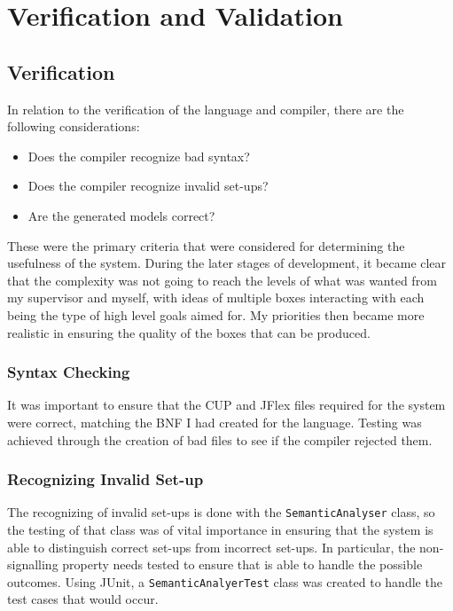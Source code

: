 \documentclass[report.tex]{subfiles}
\begin{document}
\chapter{Verification and Validation} %
\label{cha:verification_and_validation}
\section{Verification} %
\label{sec:verification}
In relation to the verification of the language and compiler, there are the
following considerations:
\begin{itemize}
    \item Does the compiler recognize bad syntax?
    \item Does the compiler recognize invalid set-ups?
    \item Are the generated models correct?
\end{itemize}

These were the primary criteria that were considered for determining the
usefulness of the system. During the later stages of development, it became
clear that the complexity was not going to reach the levels of what was wanted
from my supervisor and myself, with ideas of multiple boxes interacting with
each being the type of high level goals aimed for. My priorities then became
more realistic in ensuring the quality of the boxes that can be produced.

\subsection{Syntax Checking} %
\label{sub:syntax_checking}
It was important to ensure that the CUP and JFlex files required for the system
were correct, matching the BNF I had created for the language. Testing was
achieved through the creation of bad files to see if the compiler rejected them.

\subsection{Recognizing Invalid Set-up} %
\label{sub:recognizing_invalid_set_up}
The recognizing of invalid set-ups is done with the \texttt{SemanticAnalyser}
class, so the testing of that class was of vital importance in ensuring that
the system is able to distinguish correct set-ups from incorrect set-ups. In
particular, the non-signalling property needs tested to ensure that is able to
handle the possible outcomes. Using JUnit, a \texttt{SemanticAnalyerTest} class
was created to handle the test cases that would occur.
\end{document}

